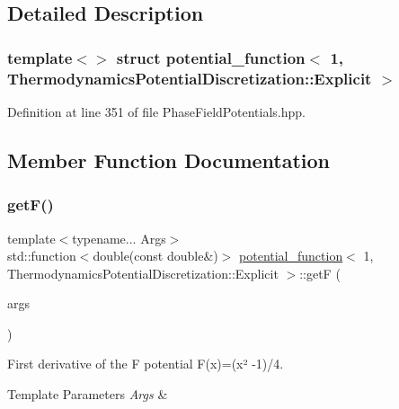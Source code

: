 \subsection{Detailed Description}
\subsubsection*{template$<$$>$\newline
struct potential\+\_\+function$<$ 1, Thermodynamics\+Potential\+Discretization\+::\+Explicit $>$}



Definition at line 351 of file Phase\+Field\+Potentials.\+hpp.



\subsection{Member Function Documentation}
\mbox{\label{structpotential__function_3_011_00_01ThermodynamicsPotentialDiscretization_1_1Explicit_01_4_aa5b8fb0d4c1b1bc1661eff409466133a}} 
\subsubsection{\texorpdfstring{get\+F()}{getF()}}
{\footnotesize\ttfamily template$<$typename... Args$>$ \\
std\+::function$<$double(const double\&)$>$ \hyperlink{structpotential__function}{potential\+\_\+function}$<$ 1, Thermodynamics\+Potential\+Discretization\+::\+Explicit $>$\+::getF (\begin{DoxyParamCaption}\item[{Args...}]{args }\end{DoxyParamCaption})\hspace{0.3cm}{\ttfamily [inline]}}



First derivative of the F potential F(x)=(x² -\/1)/4. 


\begin{DoxyTemplParams}{Template Parameters}
{\em Args} & \\
\hline
\end{DoxyTemplParams}

